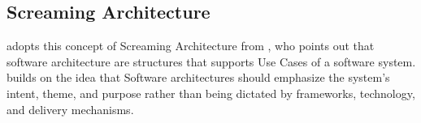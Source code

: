 \subsection{Screaming Architecture}

 adopts this concept of Screaming Architecture from
\textcite{jacobson_object-oriented_1992}, who points out that software architecture are
structures that supports Use Cases of a software system.
\textcite[195]{robert_c_martin_clean_2018} builds on the idea that Software architectures
should emphasize the system's intent, theme, and purpose rather than being dictated by
frameworks, technology, and delivery mechanisms.